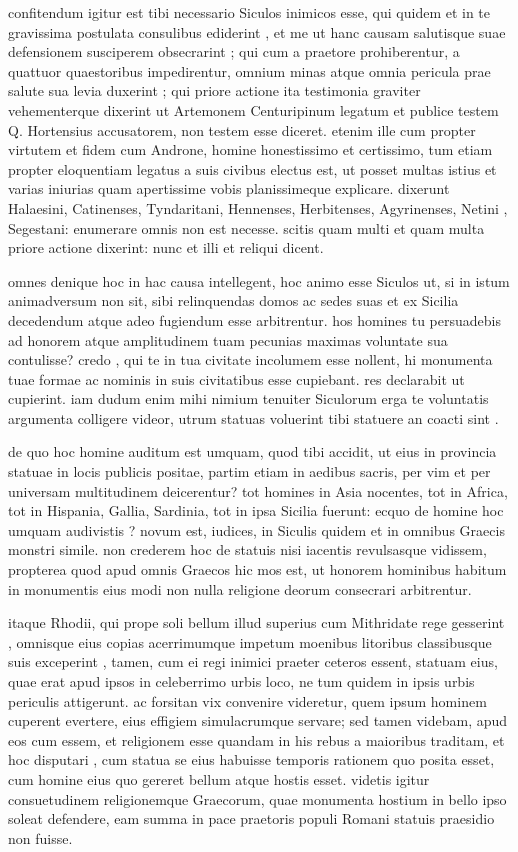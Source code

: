 confitendum igitur est tibi necessario Siculos inimicos esse, qui quidem et in te gravissima postulata consulibus ediderint , et me ut hanc causam salutisque suae defensionem susciperem obsecrarint ; qui cum a praetore prohiberentur, a quattuor quaestoribus impedirentur, omnium minas atque omnia pericula prae salute sua levia duxerint ; qui priore actione ita testimonia graviter vehementerque dixerint ut Artemonem Centuripinum legatum et publice testem Q. Hortensius accusatorem, non testem esse diceret. etenim ille cum propter virtutem et fidem cum Androne, homine honestissimo et certissimo, tum etiam propter eloquentiam legatus a suis civibus electus est, ut posset multas istius et varias iniurias quam apertissime vobis planissimeque explicare. dixerunt Halaesini, Catinenses, Tyndaritani, Hennenses, Herbitenses, Agyrinenses, Netini , Segestani: enumerare omnis non est necesse. scitis quam multi et quam multa priore actione dixerint: nunc et illi et reliqui dicent.

 omnes denique hoc in hac causa intellegent, hoc animo esse Siculos ut, si in istum animadversum non sit, sibi relinquendas domos ac sedes suas et ex Sicilia decedendum atque adeo fugiendum esse arbitrentur. hos homines tu persuadebis ad honorem atque amplitudinem tuam pecunias maximas voluntate sua contulisse? credo , qui te in tua civitate incolumem esse nollent, hi monumenta tuae formae ac nominis in suis civitatibus esse cupiebant. res declarabit ut cupierint. iam dudum enim mihi nimium tenuiter Siculorum erga te voluntatis argumenta colligere videor, utrum statuas voluerint tibi statuere an coacti sint .

 de quo hoc homine auditum est umquam, quod tibi accidit, ut eius in provincia statuae in locis publicis positae, partim etiam in aedibus sacris, per vim et per universam multitudinem deicerentur? tot homines in Asia nocentes, tot in Africa, tot in Hispania, Gallia, Sardinia, tot in ipsa Sicilia fuerunt: ecquo de homine hoc umquam audivistis ? novum est, iudices, in Siculis quidem et in omnibus Graecis monstri simile. non crederem hoc de statuis nisi iacentis revulsasque vidissem, propterea quod apud omnis Graecos hic mos est, ut honorem hominibus habitum in monumentis eius modi non nulla religione deorum consecrari arbitrentur.

 itaque Rhodii, qui prope soli bellum illud superius cum Mithridate rege gesserint , omnisque eius copias acerrimumque impetum moenibus litoribus classibusque suis exceperint , tamen, cum ei regi inimici praeter ceteros essent, statuam eius, quae erat apud ipsos in celeberrimo urbis loco, ne tum quidem in ipsis urbis periculis attigerunt. ac forsitan vix convenire videretur, quem ipsum hominem cuperent evertere, eius effigiem simulacrumque servare; sed tamen videbam, apud eos cum essem, et religionem esse quandam in his rebus a maioribus traditam, et hoc disputari , cum statua se eius habuisse temporis rationem quo posita esset, cum homine eius quo gereret bellum atque hostis esset. videtis igitur consuetudinem religionemque Graecorum, quae monumenta hostium in bello ipso soleat defendere, eam summa in pace praetoris populi Romani statuis praesidio non fuisse.

